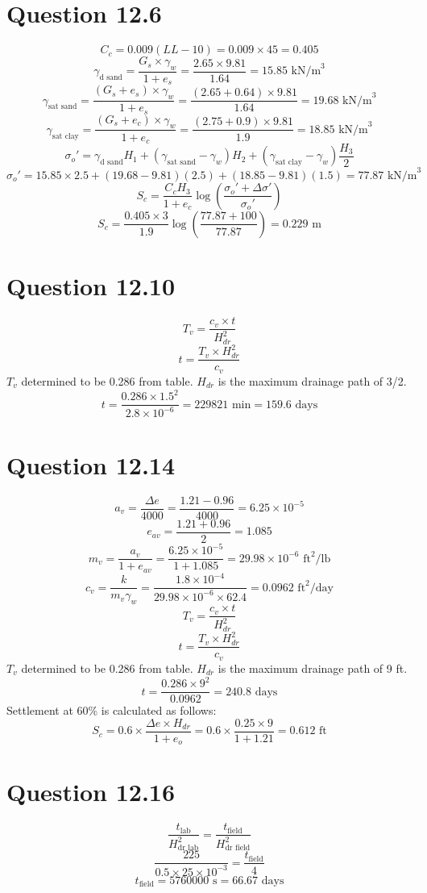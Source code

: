 \documentclass{article}
\begin{document}
\section*{Question 12.6} 
\[C_c=0.009(LL-10)=0.009\times 45=0.405\] 
\[\gamma_\text{d sand}=\frac{G_s\times \gamma_w}{1+e_s}=\frac{2.65\times 9.81}{1.64}=15.85\text{ kN/m}^3\]
\[\gamma_\text{sat sand}=\frac{(G_s+e_s)\times \gamma_w}{1+e_s}=\frac{(2.65+0.64)\times 9.81}{1.64}=19.68\text{ kN/m}^3\] 
\[\gamma_\text{sat clay}=\frac{(G_s+e_c)\times \gamma_w}{1+e_c}=\frac{(2.75+0.9)\times 9.81}{1.9}=18.85\text{ kN/m}^3\] 
\[\sigma_o'=\gamma_\text{d sand}H_1+(\gamma_\text{sat sand}-\gamma_w)H_2+(\gamma_\text{sat clay}-\gamma_w)\frac{H_3}{2}\] 
\[\sigma_o'=15.85\times 2.5 + (19.68-9.81)(2.5)+(18.85-9.81)(1.5)=77.87\text{ kN/m}^3\]
\[S_c=\frac{C_cH_3}{1+e_c}\log\left(\frac{\sigma_o'+\Delta\sigma'}{\sigma_o'}\right)\]
\[S_c=\frac{0.405\times 3}{1.9}\log\left(\frac{77.87+100}{77.87}\right)=\boxed{0.229\text{ m}}\]
\section*{Question 12.10} 
\[T_v=\frac{c_v\times t}{H_{dr}^2}\]
\[t=\frac{T_v\times H_{dr}^2}{c_v}\] 
$T_v$ determined to be 0.286 from table. $H_{dr}$ is the maximum drainage path of 3/2.
\[t=\frac{0.286\times 1.5^2}{2.8\times 10^{-6}}=229821\text{ min}=\boxed{159.6 \text{ days}}\]
\section*{Question 12.14}
\[a_v=\frac{\Delta e}{4000}=\frac{1.21-0.96}{4000}=6.25\times 10^{-5}\]
\[e_{av}=\frac{1.21+0.96}{2}=1.085\] 
\[m_v=\frac{a_v}{1+e_{av}}=\frac{6.25\times 10^{-5}}{1+1.085}=29.98\times 10^{-6} \text{ ft}^2\text{/lb}\] 
\[c_v=\frac{k}{m_v\gamma_w}=\frac{1.8\times 10^{-4}}{29.98\times 10^{-6}\times 62.4}=0.0962\text{ ft}^2\text{/day}\]
\[T_v=\frac{c_v\times t}{H_{dr}^2}\]
\[t=\frac{T_v\times H_{dr}^2}{c_v}\] 
$T_v$ determined to be 0.286 from table. $H_{dr}$ is the maximum drainage path of 9 ft.
\[t=\frac{0.286\times 9^2}{0.0962}=\boxed{240.8 \text{ days}}\]
Settlement at 60\% is calculated as follows: 
\[S_c=0.6\times \frac{\Delta e\times H_{dr}}{1+e_o}=0.6\times \frac{0.25\times 9}{1+1.21}=\boxed{0.612\text { ft}}\] 
\section*{Question 12.16}
\[\frac{t_\text{lab}}{H_\text{dr lab}^2}=\frac{t_\text{field}}{H_\text{dr field}^2}\]
\[\frac{225}{0.5\times 25\times 10^{-3}}=\frac{t_\text{field}}{4}\] 
\[t_\text{field}=5760000\text{ s}=\boxed{66.67\text{ days}}\]
\end{document}
